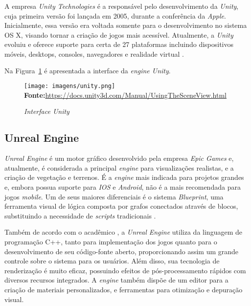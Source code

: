 A empresa \textit{Unity Technologies } é a responsável pelo desenvolvimento da \textit{Unity}, cuja primeira versão foi lançada em 2005, durante a conferência da \textit{Apple}. Inicialmente, essa versão era voltada somente para o desenvolvimento no sistema OS X, visando tornar a criação de jogos mais acessível. Atualmente, a \textit{Unity} evoluiu e oferece suporte para certa de 27 plataformas  incluindo dispositivos móveis, desktops, consoles, navegadores e realidade virtual \cite{Smid2017}.

Na Figura~\ref{fig:unity} é apresentada a interface da \textit{engine Unity}.

\FloatBarrier 
\begin{figure}[!htbp]
	\centering
	\caption{\textit{Interface Unity}}
	\texttt{[image: imagens/unity.png]}
	\\\textbf{Fonte:}\url{https://docs.unity3d.com/Manual/UsingTheSceneView.html } 
	\label{fig:unity}
\end{figure}
\FloatBarrier



\subsection{Unreal Engine}

\textit{Unreal Engine} é um motor gráfico desenvolvido pela empresa \textit{Epic Games} e, atualmente, é considerada a principal \textit{engine} para visualizações realistas, e a criação de vegetação e terrenos. É a \textit{engine} mais indicada para projetos grandes e, embora possua suporte para \textit{IOS} e \textit{Android}, não é a mais recomendada para jogos \textit{mobile}. Um de seus maiores diferenciais é o sistema \textit{Blueprint}, uma ferramenta visual de lógica composta por grafos conectados através de blocos, substituindo a necessidade de \textit{scripts} tradicionais \cite{Smid2017}.

Também de acordo com o acadêmico , a \textit{Unreal Engine} utiliza da linguagem de programação C++, tanto para implementação dos jogos quanto para o desenvolvimento de seu código-fonte aberto, proporcionando assim um grande controle sobre o sistema para os usuários. Além disso, sua tecnologia de renderização é muito eficaz, possuindo efeitos de pós-processamento rápidos com diversos recursos integrados. A \textit{engine} também dispõe de um editor para a criação de  materiais personalizados, e ferramentas para otimização e depuração visual.

